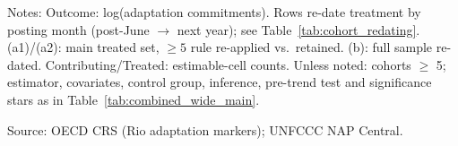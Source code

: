 \begin{table}[H]
\centering
\caption{Alternative treatment dates: re-dating adoption by submission month}
\label{tab:att_eventdate}
\begingroup\small
{}
\endgroup
\par\vspace{4pt}
\begin{minipage}{\linewidth}\footnotesize
Notes: Outcome: log(adaptation commitments). Rows re-date treatment by posting month (post-June $\to$ next year); see Table~\ref{tab:cohort_redating}. (a1)/(a2): main treated set, $\geq 5$ rule re-applied vs.\ retained. (b): full sample re-dated. Contributing/Treated: estimable-cell counts. Unless noted: cohorts $\geq$ 5; estimator, covariates, control group, inference, pre-trend test and significance stars as in Table~\ref{tab:combined_wide_main}.\par
Source: OECD CRS (Rio adaptation markers); UNFCCC NAP Central.
\end{minipage}
\end{table}
